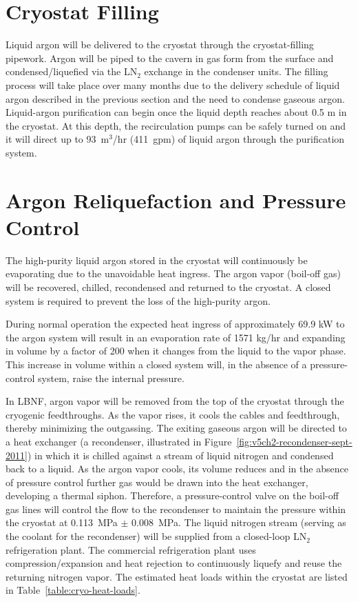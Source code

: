 \section{Cryostat Filling}

Liquid argon will be delivered to the cryostat through the 
cryostat-filling pipework. Argon will be piped to the cavern 
in gas form from the surface and condensed/liquefied via the 
LN$_{2}$ exchange in the condenser units. The filling process 
will take place over many months due to the delivery schedule 
of liquid argon described in the previous section and the 
need to condense gaseous argon. Liquid-argon purification 
can begin once the liquid depth reaches about 0.5 m in the cryostat. 
At this depth, the recirculation pumps can be safely
turned on and it will direct up to 93~m$^{3}$/hr (411~gpm) 
of liquid argon through the purification system.

\section{Argon Reliquefaction and Pressure Control}
\label{subsec:reliquef}

The high-purity liquid argon stored in the cryostat will 
continuously be evaporating due to the unavoidable heat ingress.  
The argon vapor (boil-off gas) will be recovered, chilled, 
recondensed and returned to the cryostat. A closed system 
is required to prevent the loss of the high-purity argon.

During normal operation the expected heat ingress of approximately 
69.9 kW to the argon system will result in 
an evaporation rate of 1571 kg/hr and expanding in volume by a 
factor of 200 when it changes from the liquid to the vapor phase. 
This increase in volume within a closed system will, in the 
absence of a pressure-control system, raise the internal pressure.

In LBNF, argon vapor will be removed from the top of the cryostat 
through the cryogenic feedthroughs. 
As 
the vapor rises, it cools the cables and feedthrough, thereby 
minimizing the outgassing. The exiting gaseous argon will be 
directed to a heat exchanger (a recondenser, illustrated in 
Figure~\ref{fig:v5ch2-recondenser-sept-2011}) in which it is 
chilled against a stream of liquid nitrogen and condensed 
back to a liquid. As the argon vapor cools, its volume 
reduces and in the absence of pressure control further 
gas would be drawn into the heat exchanger, developing 
a thermal siphon.  Therefore, a pressure-control valve on 
the boil-off gas lines will control the flow to the recondenser 
to maintain the pressure within the cryostat at 0.113~MPa $\pm$ 0.008~MPa.  
The liquid nitrogen stream (serving as the coolant for the 
recondenser) will be supplied from a closed-loop LN$_{2}$ refrigeration plant.  
The commercial refrigeration plant uses compression/expansion and heat 
rejection to continuously liquefy and reuse the returning nitrogen 
vapor. The estimated heat loads within the cryostat are listed 
in Table~\ref{table:cryo-heat-loads}.
 
